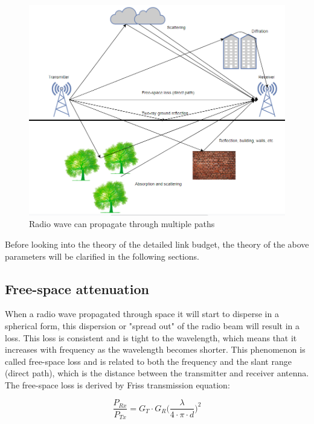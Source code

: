 \begin{figure}[h]
\centering
\includegraphics[scale=0.6]{figures/Multipath.PNG}
\caption{Radio wave can propagate through multiple paths}
\end{figure}

Before looking into the theory of the detailed link budget, the theory of the above parameters will be clarified in the following sections.


\subsection{Free-space attenuation}
When a radio wave propagated through space it will start to disperse in a spherical form, this dispersion or "spread out" of the radio beam will result in a loss. This loss is consistent and is tight to the wavelength, which means that it increases with frequency as the wavelength becomes shorter. This phenomenon is called free-space loss and is related to both the frequency and the slant range (direct path), which is the distance between the transmitter and receiver antenna. The free-space loss is derived by Friss transmission equation: 

\begin{equation}
    \frac{P_{Rx}}{P_{Tx}} = G_T \cdot G_R \Big( \frac{\lambda}{4 \cdot \pi \cdot d} \Big)^2
\end{equation}

